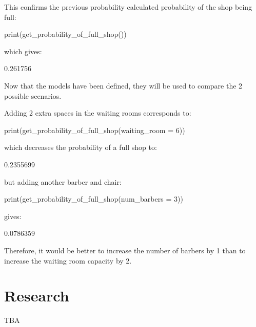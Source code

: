 This confirms the previous probability calculated probability of the shop
being full:

\begin{Rin}
print(get_probability_of_full_shop())
\end{Rin}

which gives:

\begin{Rout}
[1] 0.261756
\end{Rout}

Now that the models have been defined, they will be used to compare the 2
possible scenarios.

Adding 2 extra spaces in the waiting rooms corresponds to:

\begin{Rin}
print(get_probability_of_full_shop(waiting_room = 6))
\end{Rin}

which decreases the probability of a full shop to:

\begin{Rout}
[1] 0.2355699
\end{Rout}

but adding another barber and chair:

\begin{Rin}
print(get_probability_of_full_shop(num_barbers = 3))
\end{Rin}

gives:

\begin{Rout}
[1] 0.0786359
\end{Rout}

Therefore, it would be better to increase the number of barbers by 1
than to increase the waiting room capacity by 2.


\section{Research}\label{sec:research}

TBA
